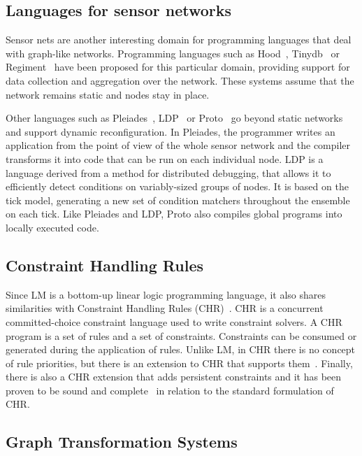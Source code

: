 \subsection{Languages for sensor networks}

Sensor nets are another interesting domain for programming languages that deal
with graph-like networks.  Programming languages such as
Hood~\cite{Whitehouse:2004:HNA:990064.990079},
Tinydb~\cite{Madden:2005:TAQ:1061318.1061322} or
Regiment~\cite{Newton:2007:RMS:1236360.1236422} have been proposed for this
particular domain, providing support for data collection and aggregation over
the network.  These systems assume that the network remains static and nodes
stay in place.

Other languages such as Pleiades~\cite{Kothari:2007:REP:1250734.1250757},
LDP~\cite{4543691} or Proto~\cite{Beal:2006:IEE:1137236.1137354} go beyond
static networks and support dynamic reconfiguration. In Pleiades, the
programmer writes an application from the point of view of the whole
sensor network and the compiler transforms it into code that can be run on
each individual node.  LDP is a language derived from a method for
distributed debugging, that allows it to efficiently detect conditions on
variably-sized groups of nodes. It is based on the tick model, generating
a new set of condition matchers throughout the ensemble on each tick.
Like Pleiades and LDP, Proto also compiles global programs into locally
executed code.

\subsection{Constraint Handling Rules}

Since LM is a bottom-up linear logic programming language, it also shares
similarities with Constraint Handling Rules
(CHR)~\cite{Betz:2005kx,Betz:2013:LBA:2422085.2422086}.  CHR is a concurrent
committed-choice constraint language used to write constraint solvers. A CHR
program is a set of rules and a set of constraints. Constraints can be consumed
or generated during the application of rules. Unlike LM, in CHR there is no
concept of rule priorities, but there is an extension to CHR that supports
them~\cite{DeKoninck:2007:URP:1273920.1273924}. Finally, there is also a CHR
extension that adds persistent constraints and it has been proven to be sound
and complete~\cite{DBLP:journals/corr/abs-1007-3829} in relation to the standard
formulation of CHR.

\subsection{Graph Transformation Systems}

